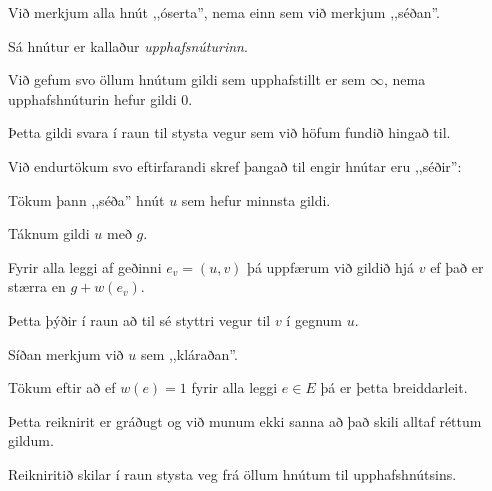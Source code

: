 {
	{
		\item<1-> Við merkjum alla hnút ,,óserta'', nema einn sem við merkjum ,,séðan''.
		\item<2-> Sá hnútur er kallaður \emph{upphafsnúturinn}.
		\item<3-> Við gefum svo öllum hnútum gildi sem upphafstillt er sem $\infty$, nema upphafshnúturin hefur gildi $0$.
		\item<4-> Þetta gildi svara í raun til stysta vegur sem við höfum fundið hingað til.
		\item<5-> Við endurtökum svo eftirfarandi skref þangað til engir hnútar eru ,,séðir'':
		{
			\item<6-> Tökum þann ,,séða'' hnút $u$ sem hefur minnsta gildi.
			\item<7-> Táknum gildi $u$ með $g$.
			\item<8-> Fyrir alla leggi af geðinni $e_v = (u, v)$ þá uppfærum við gildið hjá $v$ ef það er stærra en $g + w(e_v)$.
			\item<9-> Þetta þýðir í raun að til sé styttri vegur til $v$ í gegnum $u$.
			\item<10-> Síðan merkjum við $u$ sem ,,kláraðan''.
		}
	}
}

{
	{
		\item<1-> Tökum eftir að ef $w(e) = 1$ fyrir alla leggi $e \in E$ þá er þetta breiddarleit.
		\item<2-> Þetta reiknirit er gráðugt og við munum ekki sanna að það skili alltaf réttum gildum.
		\item<3-> Reikniritið skilar í raun stysta veg frá öllum hnútum til upphafshnútsins.
	}
}

